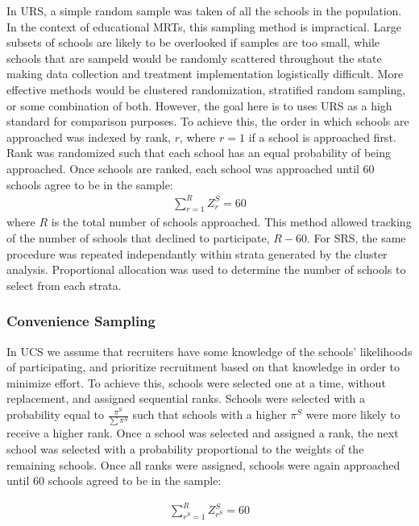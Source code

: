 \documentclass[man,floatsintext]{apa6}
\begin{document}
In URS, a simple random sample was taken of all the schools in the population. In the context of educational MRTs, this sampling method is impractical. Large subsets of schools are likely to be overlooked if samples are too small, while schools that are sampeld would be randomly scattered throughout the state making data collection and treatment implementation logistically difficult. More effective methods would be clustered randomization, stratified random sampling, or some combination of both. However, the goal here is to uses URS as a high standard for comparison purposes. To achieve this, the order in which schools are approached was indexed by rank, \(r\), where \(r = 1\) if a school is approached first. Rank was randomized such that each school has an equal probability of being approached. Once schools are ranked, each school was approached until 60 schools agree to be in the sample:
\begin{align} \label{eq:rankRS}
  \sum_{r=1}^R{Z^S_r} = 60
\end{align}
where \(R\) is the total number of schools approached. This method allowed tracking of the number of schools that declined to participate, \(R - 60\). For SRS, the same procedure was repeated independantly within strata generated by the cluster analysis. Proportional allocation was used to determine the number of schools to select from each strata.

\hypertarget{convenience-sampling}{%
\subsubsection{Convenience Sampling}\label{convenience-sampling}}

In UCS we assume that recruiters have some knowledge of the schools' likelihoods of participating, and prioritize recruitment based on that knowledge in order to minimize effort. To achieve this, schools were selected one at a time, without replacement, and assigned sequential ranks. Schools were selected with a probability equal to \(\frac{\pi^S}{\sum\pi^S}\) such that schools with a higher \(\pi^S\) were more likely to receive a higher rank. Once a school was selected and assigned a rank, the next school was selected with a probability proportional to the weights of the remaining schools. Once all ranks were assigned, schools were again approached until 60 schools agreed to be in the sample:

\begin{align} \label{eq:rankCS}
  \sum_{r^S=1}^R{Z^S_{r^S} = 60}
\end{align}
\end{document}
